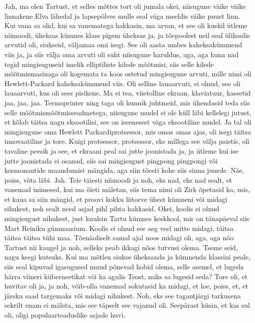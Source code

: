 Jah, ma olen Tartust, et selles mõttes tort oli jumala okei, niisugune väike väike linnakene Elva lähedal ja lapsepõlves mulle seal väga meeldis väike puust linn. Kui vana sa olid, kui sa vanematega hakkasin, ma arvan, et see oli kuskil ütleme niimoodi, üheksas kümnes klass pigem üheksas ja, ja tõepoolest neil seal ülikoolis arvutid oli, siukseid, väljamaa omi isegi. See oli aasta umbes kaheksakümmend viis ja, ja siis välja oma arvuti oli suht niisugune haruldus, aga, aga kuna nad tegid mingisuguseid imelik elliptiliste kilede mõõtmisi, siis selle kilede mõõtmismasinaga oli kogemata ta koos ostetud mingisugune arvuti, mille nimi oli Hewlett-Packard kaheksakümmend viis. Oli selline lauaarvuti, ei olnud, see oli lauaarvuti, kus oli sees pisikene. Ma ei tea, viietolline ekraan, klaviatuur, kassetid jaa, jaa, jaa. Termoprinter ning taga oli hunnik juhtmeid, mis ühendasid teda siis selle mõõtmismõõtmisseadmetega, niisugune mudel ei ole küll läbi kellelegi jutust, et kõlab täitsa nagu eksootilisi, see on iseenesest väga eksootiline mudel. Ja tal oli mingisugune oma Hewlett Packardiprotsessor, mis omas omas ajas, oli isegi täitsa innovaatiline ja tore. Kuigi protsessor, protsessor, eks millega see välja paistis, oli tavaline peesik ja see, et ekraani peal sai jutte joonistada ja, ja ütleme kui ise jutte joonistada ei osanud, siis sai mingisugust pingpong pingpongi või kosmonautide maandumist mängida, aga siin tõesti kohe siis sinna juurde. Näe, poiss, võta läbi. Jah. Teie täiesti niimoodi ja noh, eks nad, eks nad sealt, et vanemad inimesed, kui ma õieti mäletan, siis tema nimi oli Zirk õpetasid ka, mis, et kaua sa siin mängid, et proovi kokku liitorve ühest kümneni või midagi sihukest, noh sealt need asjad pihl pihta hakkasid. Okei, koolis ei olnud mingisugust nihukest, just kuulsin Tartu kümnes keskkool, mis on tänapäeval siis Mart Reiniku gümnaasium. Koolis ei olnud see aeg veel mitte midagi, täitsa täitsa täitsa tühi maa. Tõenäoliselt samal ajal noos midagi oli, aga, aga nõo Tartust nii kaugel ja noh, selleks peab ikkagi nõos tutvusi olema. Tseme seid, nagu keegi kutsuks.
Kui ma mõtlen siukse üheksanda ja kümnenda klassini peale, siis seal kipuvad igasugused muud põnevad hobid olema, selle asemel, et lugeda härra viineri küberneetikat või ka agulis
Teost, miks sa lugesid seda? Tore oli, et huvitav oli ja, ja noh, võib-olla vanemad sokutasid ka midagi, et loe, poiss, et, et järsku saad targemaks või midagi nihukest. Noh, eks see tagantjärgi tarkusena sekrilt enam ei mäleta, mis see täpselt see vajanud oli.
Seepärast küsin, et kas sul oli, oligi populaarteaduslike asjade huvi.
